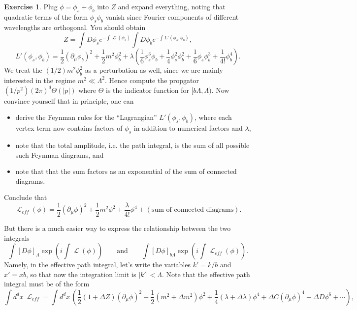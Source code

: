 \documentclass{report}
\theoremstyle{plain}
\theoremstyle{definition}
\newtheorem{exercise}{Exercise}[section]
\theoremstyle{remark}
\DeclareMathOperator{\cL}{\mathcal{L}}
\begin{document}
\begin{exercise}
  Plug $\phi = \phi_s + \phi_b$ into $Z$ and expand everything, noting
  that quadratic terms of the form $\phi_s\phi_b$ vanish since Fourier
  components of different wavelengths are orthogonal. You should obtain
  $$ Z = \int D\phi_s e^{-\int \cL(\phi_s)} \int D\phi_b e^{-\int L'(\phi_s, \phi_b)}, $$
  $$ L'(\phi_s, \phi_b) = \frac{1}{2} (\partial_\mu \phi_b)^2 + \frac{1}{2} m^2 \phi_b^2 + \lambda\left(\frac{1}{6} \phi_s^3\phi_b + \frac{1}{4} \phi_s^2\phi_b^2 + \frac{1}{6} \phi_s\phi_b^3 + \frac{1}{4!} \phi_b^4\right). $$
  We treat the $(1/2)m^2\phi_b^2$ as a perturbation as well, since we
  are mainly interested in the regime $m^2 \ll \Lambda^2$. Hence
  compute the propgator $(1/p^2)(2\pi)^d \Theta(|p|)$ where $\Theta$
  is the indicator function for $[b\Lambda, \Lambda)$. Now convince
  yourself that in principle, one can
  \begin{itemize}
  \item derive the Feynman rules for the ``Lagrangian''
    $L'(\phi_s, \phi_b)$, where each vertex term now contains factors
    of $\phi_s$ in addition to numerical factors and $\lambda$,
  \item note that the total amplitude, i.e. the path integral, is the
    sum of all possible such Feynman diagrams, and
  \item note that that the sum factors as an exponential of the sum of
    connected diagrams.
  \end{itemize}
  Conclude that
  $$ \cL_{eff}(\phi) = \frac{1}{2}(\partial_\mu\phi)^2 + \frac{1}{2}m^2\phi^2 + \frac{\lambda}{4!}\phi^4 + (\text{sum of connected diagrams}). $$
\end{exercise}

But there is a much easier way to express the relationship between the
two integrals
$$ \int [D\phi]_\Lambda \exp(i\int \cL(\phi)) \qquad \text{and} \qquad \int [D\phi]_{b\Lambda} \exp(i\int \cL_{eff}(\phi)). $$
Namely, in the effective path integral, let's write the variables
$k' = k/b$ and $x' = xb$, so that now the integration limit is
$|k'| < \Lambda$. Note that the effective path integral must be of the
form
$$ \int d^dx \, \cL_{eff} = \int d^dx \, \left(\frac{1}{2} (1 + \Delta Z)(\partial_\mu \phi)^2 + \frac{1}{2}(m^2 + \Delta m^2)\phi^2 + \frac{1}{4}(\lambda + \Delta \lambda)\phi^4 + \Delta C(\partial_\mu \phi)^4 + \Delta D \phi^6 + \cdots\right), $$
\end{document}

